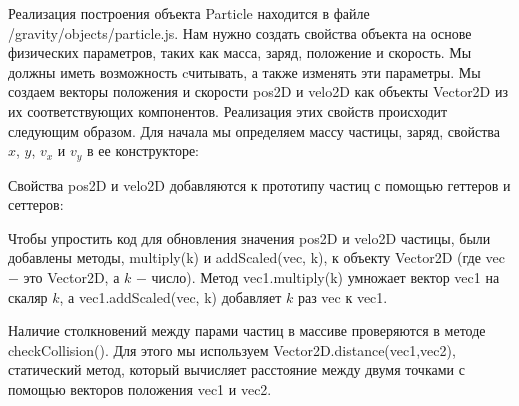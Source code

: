 \noindent Реализация построения объекта Particle находится в файле \\ /gravity/objects/particle.js. Нам нужно создать свойства объекта на основе физических параметров, таких как масса, заряд, положение и скорость. Мы должны иметь возможность cчитывать, а также изменять эти параметры. Мы создаем векторы положения и скорости pos2D и velo2D как объекты Vector2D из их соответствующих компонентов. Реализация этих свойств происходит следующим образом. Для начала мы определяем массу частицы, заряд, свойства $x$, $y$, $v_x$ и $v_y$ в ее конструкторе:


\noindent Свойства pos2D и velo2D  добавляются к прототипу частиц с помощью геттеров и сеттеров:


Чтобы упростить код для обновления значения pos2D и velo2D частицы, были добавлены методы, multiply(k) и addScaled(vec, k), к объекту Vector2D (где vec $-$ это Vector2D, а $k$ $-$ число). Метод vec1.multiply(k) умножает вектор vec1 на скаляр $k$, а vec1.addScaled(vec, k) добавляет $k$ раз vec к vec1.

Наличие столкновений между парами частиц в массиве проверяются в методе checkCollision(). Для этого мы используем Vector2D.distance(vec1,vec2), статический метод, который вычисляет расстояние между двумя точками с помощью векторов положения vec1 и vec2.


